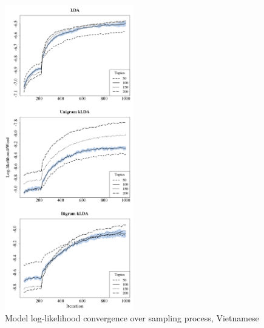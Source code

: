 \begin{figure}[t]
\begin{center}
\includegraphics[width=0.5\textwidth]{graphs/ch6/ll/vietnamese-lda-ll.png}
\end{center}
\caption[Log-Likelihood convergence, Vietnamese]{Model log-likelihood convergence over sampling process, Vietnamese\label{figC:llVietnamese}}
\end{figure}


